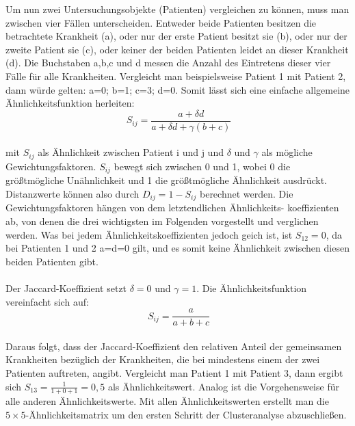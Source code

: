 \documentclass[12pt,titlepage]{article}
\begin{document}
Um nun zwei Untersuchungsobjekte (Patienten) vergleichen zu können, muss man zwischen vier Fällen unterscheiden. Entweder beide Patienten besitzen die betrachtete Krankheit (a), oder nur der erste Patient besitzt sie (b), oder nur der zweite Patient sie (c), oder keiner der beiden Patienten leidet an dieser Krankheit (d). Die Buchstaben a,b,c und d messen die Anzahl des Eintretens dieser vier Fälle für alle Krankheiten. Vergleicht man beispielsweise Patient 1 mit Patient 2, dann würde gelten: a=0; b=1; c=3; d=0. Somit lässt sich eine einfache allgemeine Ähnlichkeitsfunktion herleiten: \\
 \begin{equation}
  \ S_{ij}=\frac{a+\delta d}{a+\delta d+\gamma (b+c)}
 \end{equation} \\
mit $S_{ij}$ als Ähnlichkeit zwischen Patient i und j und $\delta$ und $\gamma$ als mögliche Gewichtungsfaktoren. $S_{ij}$ bewegt sich zwischen 0 und 1, wobei 0 die größtmögliche Unähnlichkeit und 1 die größtmögliche Ähnlichkeit ausdrückt. Distanzwerte können also durch $D_{ij}=1-S_{ij}$ berechnet werden. Die Gewichtungsfaktoren hängen von dem letztendlichen Ähnlichkeits- koeffizienten ab, von denen die drei wichtigsten im Folgenden vorgestellt und verglichen werden. Was bei jedem Ähnlichkeitskoeffizienten jedoch geich ist, ist $S_{12}=0$, da bei Patienten 1 und 2 a=d=0 gilt, und es somit keine Ähnlichkeit zwischen diesen beiden Patienten gibt. \\ 
\ \\
Der Jaccard-Koeffizient setzt $\delta =0$ und $\gamma =1$. Die Ähnlichkeitsfunktion vereinfacht sich auf:
 \begin{equation}
  \ S_{ij}=\frac{a}{a+b+c}
 \end{equation} \\
Daraus folgt, dass der Jaccard-Koeffizient den relativen Anteil der gemeinsamen Krankheiten bezüglich der Krankheiten, die bei mindestens einem der zwei Patienten auftreten, angibt. Vergleicht man Patient 1 mit Patient 3, dann ergibt sich $S_{13}=\frac{1}{1+0+1}=0,5$ als Ähnlichkeitswert. Analog ist die Vorgehensweise für alle anderen Ähnlichkeitswerte. Mit allen Ähnlichkeitswerten erstellt man die $5\times 5$-Ähnlichkeitsmatrix um den ersten Schritt der Clusteranalyse abzuschließen.\\
\end{document}
